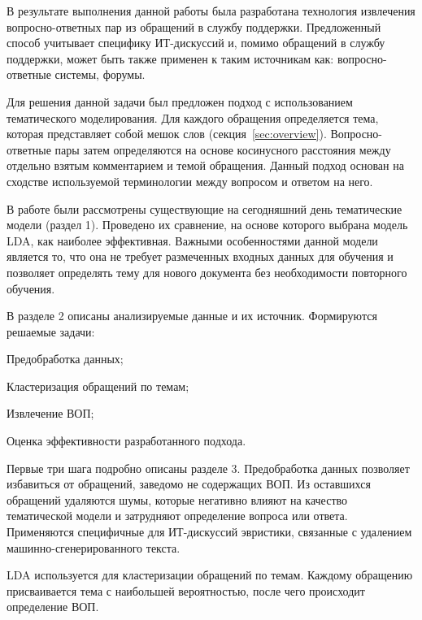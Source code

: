 \conclusion
В результате выполнения данной работы была разработана технология извлечения вопросно-ответных пар из обращений в службу поддержки. Предложенный способ учитывает специфику ИТ-дискуссий и, помимо обращений в службу поддержки, может быть также применен к таким источникам как: вопросно-ответные системы, форумы.

Для решения данной задачи был предложен подход с использованием тематического моделирования. Для каждого обращения определяется тема, которая представляет собой мешок слов (секция~\ref{sec:overview}). Вопросно-ответные пары затем определяются на основе косинусного расстояния между отдельно взятым комментарием и темой обращения. Данный подход основан на сходстве используемой терминологии между вопросом и ответом на него.

В работе были рассмотрены существующие на сегодняшний день тематические модели (раздел 1). Проведено их сравнение, на основе которого выбрана модель LDA, как наиболее эффективная. Важными особенностями данной модели является то, что она не требует размеченных входных данных для обучения и позволяет определять тему для нового документа без необходимости повторного обучения.

В разделе 2 описаны анализируемые данные и их источник. Формируются решаемые задачи: 

\begin{enumerate*}
\item Предобработка данных;
\item Кластеризация обращений по темам;
\item Извлечение ВОП;
\item Оценка эффективности разработанного подхода.
\end{enumerate*}

Первые три шага подробно описаны разделе 3. Предобработка данных позволяет избавиться от обращений, заведомо не содержащих ВОП. Из оставшихся обращений удаляются шумы, которые негативно влияют на качество тематической модели и затрудняют определение вопроса или ответа. Применяются специфичные для ИТ-дискуссий эвристики, связанные с удалением машинно-сгенерированного текста. 

LDA используется для кластеризации обращений по темам. Каждому обращению присваивается тема с наибольшей вероятностью, после чего происходит определение ВОП.

